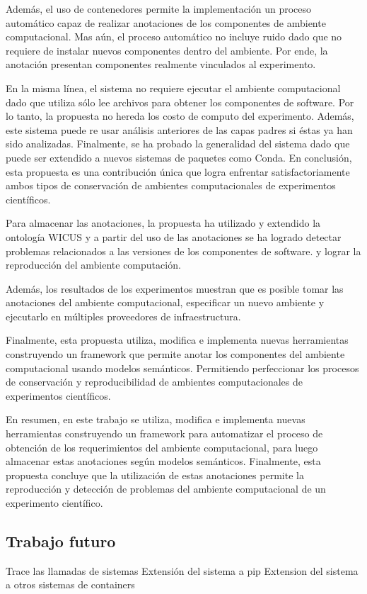 Además, el uso de contenedores permite la implementación un proceso 
automático capaz de realizar anotaciones de los componentes de
ambiente computacional. 
Mas aún, el proceso automático no incluye ruido dado que no requiere de instalar nuevos componentes dentro del ambiente. 
Por ende, la anotación presentan componentes realmente vinculados al experimento.

En la misma línea, el sistema no requiere ejecutar el ambiente 
computacional dado que utiliza sólo lee archivos para obtener 
los componentes de software.
Por lo tanto, la propuesta no hereda los costo de computo del
experimento.
Además, este sistema puede re usar análisis anteriores de las capas padres si éstas ya han sido analizadas. 
Finalmente, se ha probado la generalidad del sistema dado que puede 
ser extendido a nuevos sistemas de paquetes como Conda.
En conclusión, esta propuesta es una contribución única 
que logra enfrentar satisfactoriamente ambos tipos de conservación de ambientes computacionales de experimentos científicos. 


Para almacenar las anotaciones, la propuesta ha utilizado y extendido la ontología WICUS \cite{santana2015towards} y a partir del uso de las anotaciones se ha logrado detectar problemas relacionados a las versiones de los componentes de software. y lograr la reproducción del ambiente computación.

Además, los resultados de los experimentos muestran que es posible tomar las anotaciones del ambiente computacional, especificar un nuevo ambiente y ejecutarlo en múltiples proveedores de infraestructura.

Finalmente, esta propuesta utiliza, modifica e implementa nuevas herramientas construyendo un framework que permite anotar los componentes del ambiente computacional usando modelos semánticos.
Permitiendo perfeccionar los procesos de conservación y reproducibilidad de ambientes computacionales de experimentos científicos.

En resumen, en este trabajo se utiliza, modifica e implementa nuevas herramientas construyendo un framework para automatizar el proceso de obtención de los requerimientos del ambiente computacional, para luego almacenar estas anotaciones según modelos semánticos. Finalmente, esta propuesta concluye que la utilización de estas anotaciones permite la reproducción y detección de problemas del ambiente computacional de un experimento científico.

\subsection{Trabajo futuro}

Trace las llamadas de sistemas
Extensión del sistema a pip
Extension del sistema a otros sistemas de containers